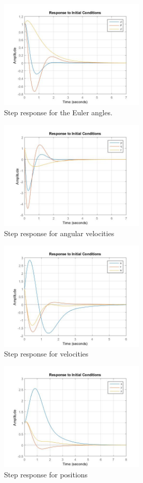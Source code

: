 \documentclass[journal]{IEEEtran}
\begin{document}
	
		\begin{figure}[H]
  			\centering
  			\includegraphics[width=7cm]{Results/Controll/Fig1}
  			\caption{Step response for the Euler angles.}
  			\label{fig:contresangles}
		\end{figure}	
		
		\begin{figure}[H]
  			\centering
  			\includegraphics[width=7cm]{Results/Controll/Fig2}
  			\caption{Step response for angular velocities}
  			\label{fig:contresangvel}
		\end{figure}	

		\begin{figure}[H]
  			\centering
  			\includegraphics[width=7cm]{Results/Controll/Fig3}
  			\caption{Step response for velocities}
  			\label{fig:contresvel}
		\end{figure}	
		
		\begin{figure}[H]
  			\centering
  			\includegraphics[width=7cm]{Results/Controll/Fig4}
  			\caption{Step response for positions}
  			\label{fig:contrespos}
		\end{figure}	
		
\end{document}
